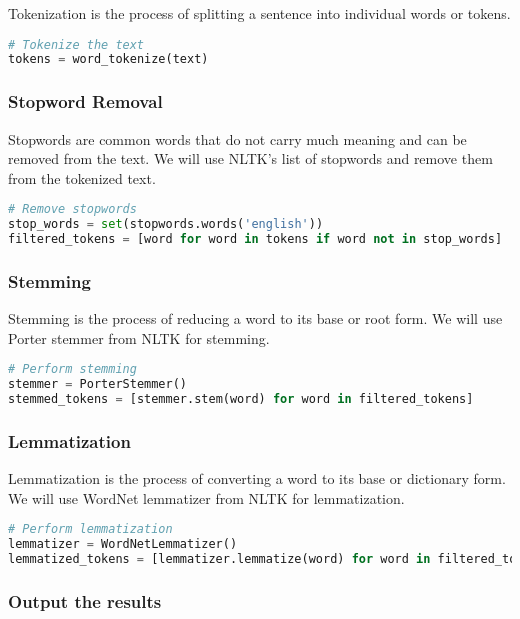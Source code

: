 Tokenization is the process of splitting a sentence into individual
words or tokens.

\begin{lstlisting}[language=Python]
# Tokenize the text
tokens = word_tokenize(text)
\end{lstlisting}

\subsubsection{Stopword Removal}\label{stopword-removal}

Stopwords are common words that do not carry much meaning and can be
removed from the text. We will use NLTK's list of stopwords and remove
them from the tokenized text.

\begin{lstlisting}[language=Python]
# Remove stopwords
stop_words = set(stopwords.words('english'))
filtered_tokens = [word for word in tokens if word not in stop_words]
\end{lstlisting}

\subsubsection{Stemming}\label{stemming}

Stemming is the process of reducing a word to its base or root form. We
will use Porter stemmer from NLTK for stemming.

\begin{lstlisting}[language=Python]
# Perform stemming
stemmer = PorterStemmer()
stemmed_tokens = [stemmer.stem(word) for word in filtered_tokens]
\end{lstlisting}

\subsubsection{Lemmatization}\label{lemmatization}

Lemmatization is the process of converting a word to its base or
dictionary form. We will use WordNet lemmatizer from NLTK for
lemmatization.

\begin{lstlisting}[language=Python]
# Perform lemmatization
lemmatizer = WordNetLemmatizer()
lemmatized_tokens = [lemmatizer.lemmatize(word) for word in filtered_tokens]
\end{lstlisting}

\subsubsection{Output the results}\label{output-the-results}

